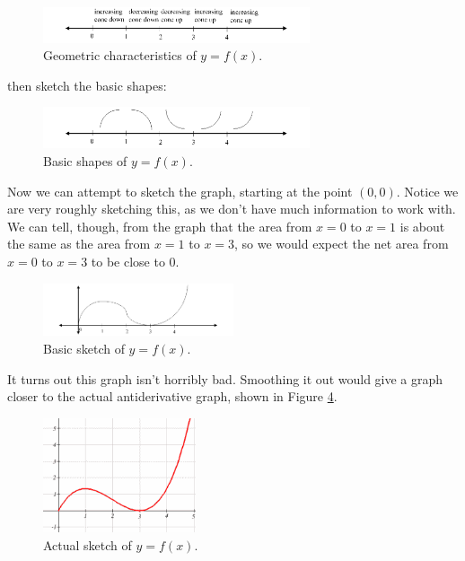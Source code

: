 \begin{example}
\begin{solution}
\begin{figure}[!ht]
  \centering
    \includegraphics[width=0.7\textwidth]{img/chap5/image067.png}
    \caption{Geometric characteristics of $y=f(x)$.}
    \label{fig:5-4-shapes}
\end{figure}
then sketch the basic shapes:
\begin{figure}[!ht]
  \centering
    \includegraphics[width=0.7\textwidth]{img/chap5/image068.png}
    \caption{Basic shapes of $y=f(x)$.}
    \label{fig:5-4-curves}
\end{figure}

Now we can attempt to sketch the graph, starting at the point $(0, 0)$. Notice we are very roughly sketching this, as we don't have much information to work with. We can tell, though, from the graph that the area from $x=0$ to $x=1$ is about the same as the area from $x=1$ to $x=3$, so we would expect the net area from $x=0$ to $x=3$ to be close to 0.

\begin{figure}[!ht]
  \centering
    \includegraphics[width=0.5\textwidth]{img/chap5/image069.png}
    \caption{Basic sketch of $y=f(x)$.}
    \label{fig:5-4-sketch}
\end{figure}
It turns out this graph isn't horribly bad. Smoothing it out would give a graph closer to the actual antiderivative graph, shown in Figure \ref{fig:5-4-realsketch}.

\begin{figure}[!ht]
  \centering
    \includegraphics[width=0.4\textwidth]{img/chap5/image039.png}
    \caption{Actual sketch of $y=f(x)$.}
    \label{fig:5-4-realsketch}
\end{figure}
\end{solution}\end{example}

